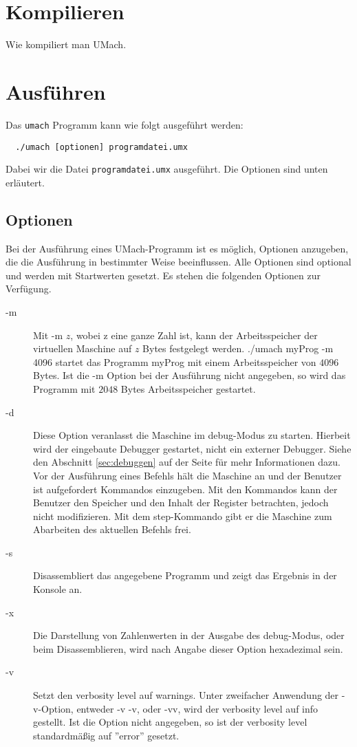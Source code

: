 \section{Kompilieren}

Wie kompiliert man UMach.


\section{Ausführen}

Das \texttt{umach} Programm kann wie folgt ausgeführt werden:
\begin{lstlisting}
  ./umach [optionen] programdatei.umx
\end{lstlisting}

Dabei wir die Datei \texttt{programdatei.umx} ausgeführt. Die Optionen sind
unten erläutert.


\subsection{Optionen}
Bei der Ausführung eines UMach-Programm ist es möglich, Optionen anzugeben, die
die Ausführung in bestimmter Weise beeinflussen. Alle Optionen sind optional und
werden mit Startwerten gesetzt. Es stehen die folgenden Optionen zur Verfügung.
\begin{description}
\item[-m]
Mit \glqq{}-m $z$\grqq{}, wobei \glqq{}z\grqq{} eine ganze Zahl ist, kann der
Arbeitsspeicher der virtuellen Maschine auf $z$ Bytes festgelegt werden.
\grqq{}./umach myProg -m 4096\grqq{} startet das Programm \glqq{}myProg\grqq{}
mit einem Arbeitsspeicher von $4096$ Bytes. Ist die \glqq{}-m\grqq{} Option bei
der Ausführung nicht angegeben, so wird das Programm mit $2048$ Bytes
Arbeitsspeicher gestartet.
\item[-d]
Diese Option veranlasst die Maschine im \glqq{}debug\grqq{}-Modus zu starten.
Hierbeit wird der eingebaute Debugger gestartet, nicht ein externer Debugger.
Siehe den Abschnitt \ref{sec:debuggen} auf der Seite \pageref{sec:debuggen} für
mehr Informationen dazu. Vor der Ausführung eines Befehls hält die Maschine an
und der Benutzer ist aufgefordert Kommandos einzugeben. Mit den Kommandos kann
der Benutzer den Speicher und den Inhalt der Register betrachten, jedoch nicht
modifizieren. Mit dem \glqq{}step\grqq{}-Kommando gibt er die Maschine zum
Abarbeiten des aktuellen Befehls frei.
\item[-s]
Disassembliert das angegebene Programm und zeigt das Ergebnis in der Konsole an.
\item[-x]
Die Darstellung von Zahlenwerten in der Ausgabe des \glqq{}debug\grqq{}-Modus,
oder beim Disassemblieren, wird nach Angabe dieser Option hexadezimal sein.
\item[-v]
Setzt den \glqq{}verbosity level\grqq{} auf \glqq{}warnings\grqq{}. Unter
zweifacher Anwendung der \glqq{}-v\grqq{}-Option, entweder \glqq{}-v -v\grqq{},
oder \glqq{}-vv\grqq{}, wird der \glqq{}verbosity level\grqq{} auf
\glqq{}info\grqq{} gestellt. Ist die Option nicht angegeben, so ist der
\glqq{}verbosity level\grqq{} standardmäßig auf ''error'' gesetzt.


\end{description}

